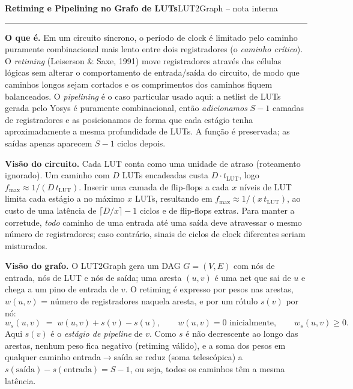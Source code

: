 \documentclass[10pt]{article}
\begin{document}
{\large\bfseries Retiming e Pipelining no Grafo de LUTs}\hfill{\small LUT2Graph -- nota interna}
\vspace{-4pt}\par\noindent\rule{\linewidth}{0.4pt}

\textbf{O que é.}
Em um circuito síncrono, o período de clock é limitado pelo caminho puramente combinacional mais lento entre
dois registradores (o \emph{caminho crítico}). O \emph{retiming} (Leiserson \& Saxe, 1991) move registradores através
das células lógicas sem alterar o comportamento de entrada/saída do circuito, de modo que caminhos longos sejam
cortados e os comprimentos dos caminhos fiquem balanceados. O \emph{pipelining} é o caso particular usado aqui: a
netlist de LUTs gerada pelo Yosys é puramente combinacional, então \emph{adicionamos} $S-1$ camadas de registradores
e as posicionamos de forma que cada estágio tenha aproximadamente a mesma profundidade de LUTs. A função é
preservada; as saídas apenas aparecem $S-1$ ciclos depois.

\textbf{Visão do circuito.}
Cada LUT conta como uma unidade de atraso (roteamento ignorado). Um caminho com $D$ LUTs encadeadas custa
$D\cdot t_{\mathrm{LUT}}$, logo $f_{\max}\approx 1/(D\, t_{\mathrm{LUT}})$. Inserir uma camada de flip-flops a cada
$x$ níveis de LUT limita cada estágio a no máximo $x$ LUTs, resultando em $f_{\max}\approx 1/(x\, t_{\mathrm{LUT}})$,
ao custo de uma latência de $\lceil D/x\rceil-1$ ciclos e de flip-flops extras. Para manter a corretude, \emph{todo}
caminho de uma entrada até uma saída deve atravessar o mesmo número de registradores; caso contrário, sinais de
ciclos de clock diferentes seriam misturados.

\textbf{Visão do grafo.}
O LUT2Graph gera um DAG $G=(V,E)$ com nós de entrada, nós de LUT e nós de saída; uma aresta $(u,v)$ é uma net que
sai de $u$ e chega a um pino de entrada de $v$. O retiming é expresso por pesos nas arestas, $w(u,v)$ = número de
registradores naquela aresta, e por um rótulo $s(v)$ por nó:
\[
  w_s(u,v) \;=\; w(u,v) + s(v) - s(u), \qquad w(u,v)=0 \text{ inicialmente}, \qquad w_s(u,v)\ge 0 .
\]
Aqui $s(v)$ é o \emph{estágio de pipeline} de $v$. Como $s$ é não decrescente ao longo das arestas, nenhum peso fica
negativo (retiming válido), e a soma dos pesos em qualquer caminho entrada$\to$saída se reduz (soma telescópica) a
$s(\text{saída})-s(\text{entrada}) = S-1$, ou seja, todos os caminhos têm a mesma latência.
\end{document}
